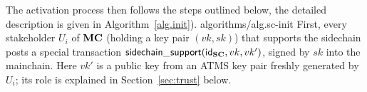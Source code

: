 

The activation process then follows the steps outlined below, the detailed
description is  given in
Algorithm~\ref{alg.init}).
{algorithms/alg.sc-init}
    First, every stakeholder $U_i$ of $\mathbf{MC}$ (holding a key pair $(vk,sk)$) that supports the sidechain
    posts a special transaction
    $
    \mathsf{sidechain\_support}(\mathsf{id}_{\mathbf{SC}},vk,vk')
    $,
    signed by $sk$
    into the mainchain. Here $vk'$ is a public key from an ATMS key pair
    freshly generated by $U_i$; its role is explained in Section~\ref{sec:trust}
    below.

